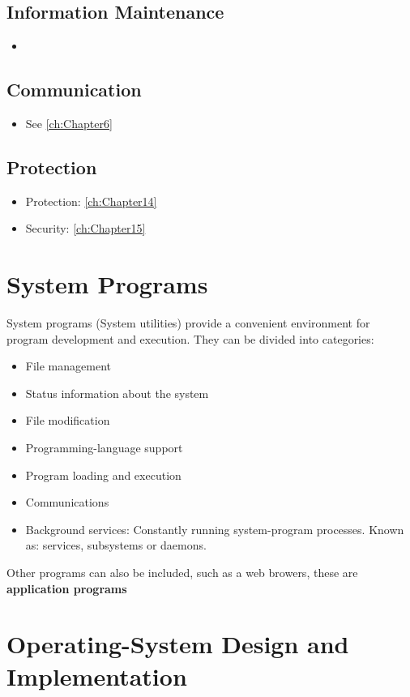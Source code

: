 \documentclass[10pt]{report}
\begin{document}
			\subsection{Information Maintenance}
  			\begin{itemize}
  				\item
  			\end{itemize}
			\subsection{Communication}
  			\begin{itemize}
  				\item See \autoref{ch:Chapter6}
  			\end{itemize}
			\subsection{Protection}
  			\begin{itemize}
  				\item Protection: \autoref{ch:Chapter14}
  				\item Security: \autoref{ch:Chapter15}
  			\end{itemize}
    \section{System Programs}
      System programs (System utilities) provide a convenient environment for program development and execution. They can be divided into categories:
      \begin{itemize}
        \item File management
        \item Status information about the system
        \item File modification
        \item Programming-language support
        \item Program loading and execution
        \item Communications
        \item Background services: Constantly running system-program processes. Known as: services, subsystems or daemons.
      \end{itemize}
      Other programs can also be included, such as a web browers, these are \textbf{application programs}

    \section{Operating-System Design and Implementation}
\end{document}
